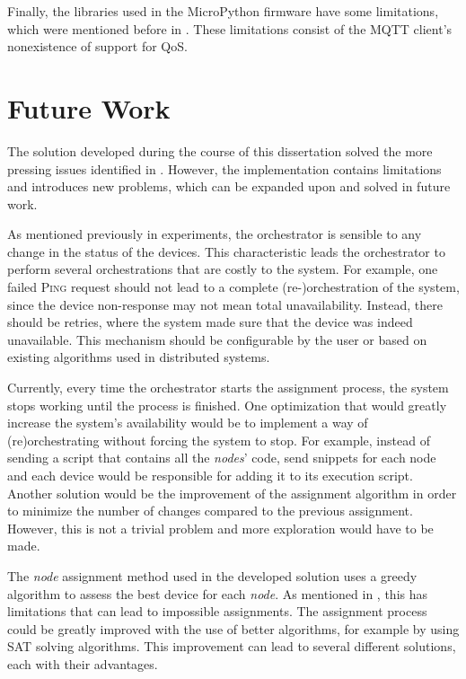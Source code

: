 Finally, the libraries used in the MicroPython firmware have some limitations, which were mentioned before in . These limitations consist of the MQTT client's nonexistence of support for QoS.

\section{Future Work}\label{sec:future_work}

The solution developed during the course of this dissertation solved the more pressing issues identified in . However, the implementation contains limitations and introduces new problems, which can be expanded upon and solved in future work.

As mentioned previously in  experiments, the orchestrator is sensible to any change in the status of the devices. This characteristic leads the orchestrator to perform several orchestrations that are costly to the system. For example, one failed \textsc{Ping} request should not lead to a complete (re-)orchestration of the system, since the device non-response may not mean total unavailability. Instead, there should be retries, where the system made sure that the device was indeed unavailable. This mechanism should be configurable by the user or based on existing algorithms used in distributed systems.

Currently, every time the orchestrator starts the assignment process, the system stops working until the process is finished. One optimization that would greatly increase the system's availability would be to implement a way of (re)orchestrating without forcing the system to stop. For example, instead of sending a script that contains all the \textit{nodes}' code, send snippets for each node and each device would be responsible for adding it to its execution script. Another solution would be the improvement of the assignment algorithm in order to minimize the number of changes compared to the previous assignment. However, this is not a trivial problem and more exploration would have to be made.

The \textit{node} assignment method used in the developed solution uses a greedy algorithm to assess the best device for each \textit{node}. As mentioned in , this has limitations that can lead to impossible assignments. The assignment process could be greatly improved with the use of better algorithms, for example by using SAT solving algorithms. This improvement can lead to several different solutions, each with their advantages.

